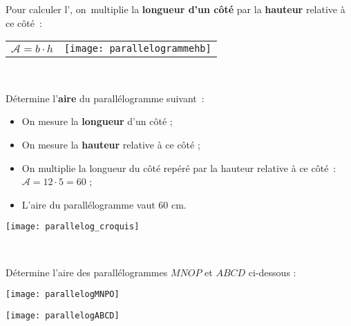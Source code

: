 \vspace{2em}

\begin{aconnaitre}
Pour calculer l’, on multiplie la \textbf{\textcolor{H1}{longueur d'un côté}} par la \textbf{\textcolor{C2}{hauteur}} relative à ce côté :

\vspace{1em}

\begin{tabularx}{\textwidth}{XX}
{\large $\mathcal{A} = b \cdot h$} & \texttt{[image: parallelogrammehb]} \\
 \end{tabularx} \\

\end{aconnaitre}


\vspace{4em}

\begin{methode*1}


\begin{exemple*1}
Détermine l’\textbf{aire} du parallélogramme suivant :
\begin{minipage}[c]{0.65\textwidth}
\begin{itemize}
 \item On mesure la \textbf{\textcolor{H1}{longueur}} d'un côté ;
 \item On mesure la \textbf{\textcolor{C2}{hauteur}} relative à ce côté ;
 \item On multiplie la longueur du côté repéré par la hauteur relative à ce côté : $\mathcal{A} = 12 \cdot 5 = 60$ ;
 \item L'aire du parallélogramme vaut 60 cm.
 \end{itemize}
 \end{minipage} \hfill%
 \begin{minipage}[c]{0.26\textwidth}
 \texttt{[image: parallelog\_croquis]}
 \end{minipage} \\
\end{exemple*1}

\exercice 
Détermine l’aire des parallélogrammes $MNOP$ et $ABCD$ ci-dessous :
\begin{colenumerate}{2}
 \item 
 
 \texttt{[image: parallelogMNPO]}
 \item 
 
 \texttt{[image: parallelogABCD]}
 \end{colenumerate}

\end{methode*1}

